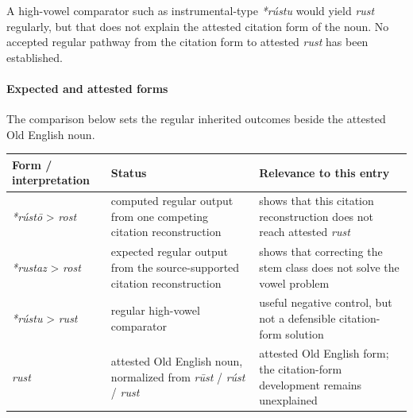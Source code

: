 \documentclass[
  british,
  a4paper,
]{article}
\newcounter{none} %
\begin{document}
A high-vowel comparator such as instrumental-type \emph{*rústu} would
yield \emph{rust} regularly, but that does not explain the attested
citation form of the noun. No accepted regular pathway from the citation
form to attested \emph{rust} has been established.

\paragraph{Expected and attested
forms}\label{expected-and-attested-forms-1}

The comparison below sets the regular inherited outcomes beside the
attested Old English noun.

{\def\LTcaptype{none} %
\begin{longtable}[]{@{}
  >{\raggedright\arraybackslash}p{}
  >{\raggedright\arraybackslash}p{}
  >{\raggedright\arraybackslash}p{}@{}}
\toprule\noalign{}
\begin{minipage}[b]{\linewidth}\raggedright
Form / interpretation
\end{minipage} & \begin{minipage}[b]{\linewidth}\raggedright
Status
\end{minipage} & \begin{minipage}[b]{\linewidth}\raggedright
Relevance to this entry
\end{minipage} \\
\midrule\noalign{}
\endhead
\bottomrule\noalign{}
\endlastfoot
\emph{*rústō} \textgreater{} \emph{rost} & computed regular output from
one competing citation reconstruction & shows that this citation
reconstruction does not reach attested \emph{rust} \\
\emph{*rustaz} \textgreater{} \emph{rost} & expected regular output from
the source-supported citation reconstruction & shows that correcting the
stem class does not solve the vowel problem \\
\emph{*rústu} \textgreater{} \emph{rust} & regular high-vowel comparator
& useful negative control, but not a defensible citation-form
solution \\
\emph{rust} & attested Old English noun, normalized from \emph{rūst} /
\emph{rúst} / \emph{rust} & attested Old English form; the citation-form
development remains unexplained \\
\end{longtable}
}
\end{document}
